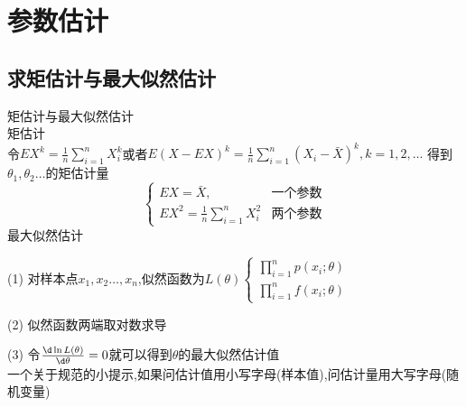 \documentclass[12pt, a4paper, oneside, UTF8]{ctexbook}
\begin{document}
% 
\else
\fi

\chapter{参数估计}

\section{求矩估计与最大似然估计}
\begin{remark}
    矩估计与最大似然估计 \\
    矩估计\\
    令$EX^k=\frac{1}{n}\sum_{i=1}^{n}X_i^k$或者$E(X-EX)^k=\frac{1}{n}\sum_{i=1}^{n}(X_i-\bar{X})^k,k=1,2,\ldots$
    得到$\theta_1,\theta_2\ldots$的矩估计量 \\
    \[
    \begin{cases}
        EX=\bar{X}, &\text{一个参数} \\
        EX^2=\frac{1}{n}\sum_{i=1}^{n}X_i^2 & \text{两个参数}
    \end{cases}
    \]
    最大似然估计
    \item[(1)]对样本点$x_1,x_2\ldots,x_n$,似然函数为$L(\theta)\begin{cases}
        \prod_{i=1}^{n}p(x_i;\theta) \\
        \prod_{i=1}^{n}f(x_i;\theta) 
    \end{cases}$
    \item[(2)]似然函数两端取对数求导 
    \item[(3)]令$\frac{\d\ln{L(\theta)}}{\d\theta}=0$就可以得到$\theta$的最大似然估计值\\ 
    一个关于规范的小提示,如果问估计值用小写字母(样本值),问估计量用大写字母(随机变量)
\end{remark}
\end{document}
